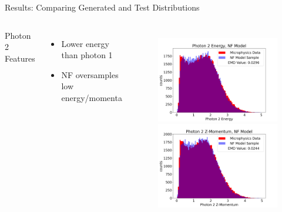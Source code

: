 \documentclass[aspectratio=169]{beamer}
\begin{document}
\begin{frame}{Results: Comparing Generated and Test Distributions}
   \begin{columns}
            Photon 2 Features
            \begin{itemize}
                    \setlength\itemsep{0.3em}
                    \item Lower energy than photon 1
                    \item NF oversamples low energy/momenta
            \end{itemize}
   
            \begin{figure}[H]
            \centering
            \includegraphics[width=.97\textwidth]{images/Features16/Photon_2_Energy,_NF_Model.png}
            \includegraphics[width=.97\textwidth]{images/Features16/Photon_2_Z-Momentum,_NF_Model.png}
            \label{fig:clas6}
            \end{figure}
            

\end{columns}
\end{frame}
\end{document}
